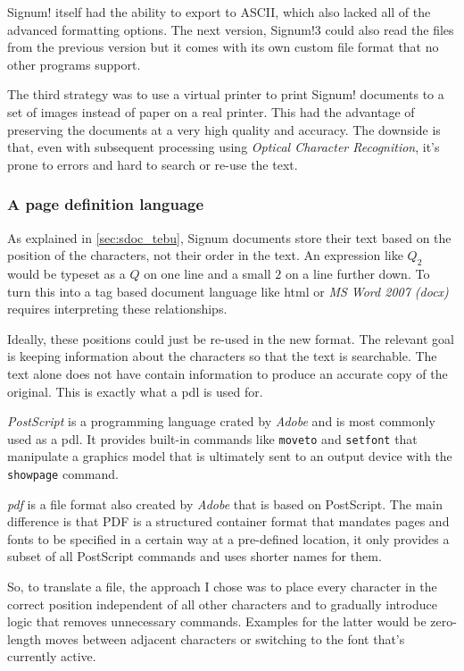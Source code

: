 Signum! itself had the ability to export to ASCII, which also lacked all of the advanced formatting options. The next version, Signum!3 could also read the files from the previous version but it comes with its own custom file format that no other programs support.

The third strategy was to use a virtual printer to print Signum! documents to a set of images instead of paper on a real printer. This had the advantage of preserving the documents at a very high quality and accuracy. The downside is that, even with subsequent processing using \textit{Optical Character Recognition}, it's prone to errors and hard to search or re-use the text.

\subsubsection{A page definition language}

As explained in \autoref{sec:sdoc_tebu}, Signum documents store their text based on the position of the characters, not their order in the text. An expression like $Q_2$ would be typeset as a $Q$ on one line and a small $2$ on a line further down. To turn this into a tag based document language like \acrshort{html} or \textit{MS Word 2007 (docx)} requires interpreting these relationships.

Ideally, these positions could just be re-used in the new format. The relevant goal is keeping information about the characters so that the text is searchable. The text alone does not have contain information to produce an accurate copy of the original. This is exactly what a \acrfull{pdl} is used for.

\textit{PostScript} is a programming language crated by \textit{Adobe} and is most commonly used as a \acrlong{pdl}. It provides built-in commands like \texttt{moveto} and \texttt{setfont} that manipulate a graphics model that is ultimately sent to an output device with the \texttt{showpage} command.

\textit{\acrshort{pdf}} is a file format also created by \textit{Adobe} that is based on PostScript. The main difference is that PDF is a structured container format that mandates pages and fonts to be specified in a certain way at a pre-defined location, it only provides a subset of all PostScript commands and uses shorter names for them.

So, to translate a \Signum{} file, the approach I chose was to place every character in the correct position independent of all other characters and to gradually introduce logic that removes unnecessary commands. Examples for the latter would be zero-length moves between adjacent characters or switching to the font that's currently active.

